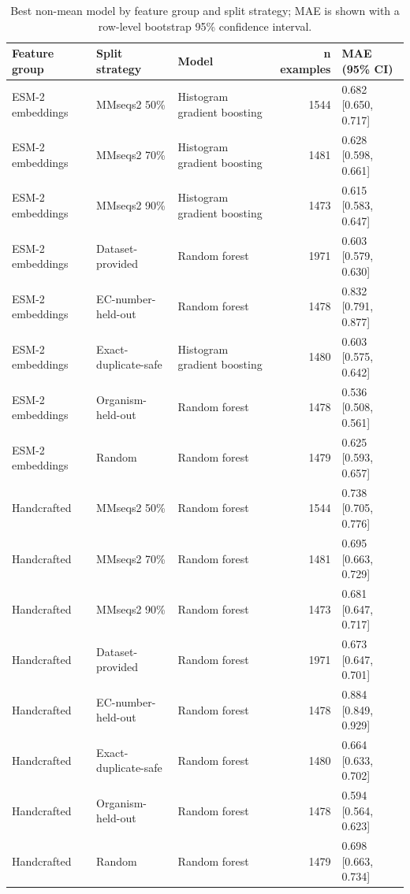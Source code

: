 \begin{table}
\caption{Best non-mean model by feature group and split strategy; MAE is shown with a row-level bootstrap 95\% confidence interval.}
\label{tab:model-comparison}
\begin{tabular}{lllrl}
\toprule
Feature group & Split strategy & Model & n examples & MAE (95\% CI) \\
\midrule
ESM-2 embeddings & MMseqs2 50\% & Histogram gradient boosting & 1544 & 0.682 [0.650, 0.717] \\
ESM-2 embeddings & MMseqs2 70\% & Histogram gradient boosting & 1481 & 0.628 [0.598, 0.661] \\
ESM-2 embeddings & MMseqs2 90\% & Histogram gradient boosting & 1473 & 0.615 [0.583, 0.647] \\
ESM-2 embeddings & Dataset-provided & Random forest & 1971 & 0.603 [0.579, 0.630] \\
ESM-2 embeddings & EC-number-held-out & Random forest & 1478 & 0.832 [0.791, 0.877] \\
ESM-2 embeddings & Exact-duplicate-safe & Histogram gradient boosting & 1480 & 0.603 [0.575, 0.642] \\
ESM-2 embeddings & Organism-held-out & Random forest & 1478 & 0.536 [0.508, 0.561] \\
ESM-2 embeddings & Random & Random forest & 1479 & 0.625 [0.593, 0.657] \\
Handcrafted & MMseqs2 50\% & Random forest & 1544 & 0.738 [0.705, 0.776] \\
Handcrafted & MMseqs2 70\% & Random forest & 1481 & 0.695 [0.663, 0.729] \\
Handcrafted & MMseqs2 90\% & Random forest & 1473 & 0.681 [0.647, 0.717] \\
Handcrafted & Dataset-provided & Random forest & 1971 & 0.673 [0.647, 0.701] \\
Handcrafted & EC-number-held-out & Random forest & 1478 & 0.884 [0.849, 0.929] \\
Handcrafted & Exact-duplicate-safe & Random forest & 1480 & 0.664 [0.633, 0.702] \\
Handcrafted & Organism-held-out & Random forest & 1478 & 0.594 [0.564, 0.623] \\
Handcrafted & Random & Random forest & 1479 & 0.698 [0.663, 0.734] \\
\bottomrule
\end{tabular}
\end{table}
